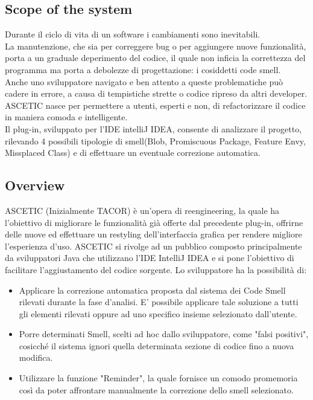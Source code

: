 	   
	   	\subsection{Scope of the system}
	   		Durante il ciclo di vita di un software i cambiamenti sono inevitabili.\\
	   		La manutenzione, che sia per correggere bug o per aggiungere nuove funzionalità, porta a un graduale deperimento del codice, il quale non inficia la correttezza del programma ma porta a debolezze di progettazione: i cosiddetti code smell.\\
	   		Anche uno sviluppatore navigato e ben attento a queste problematiche può cadere in errore, a causa di tempistiche strette o codice ripreso da altri developer.\\
	   	    ASCETIC nasce per permettere a utenti, esperti e non, di refactorizzare il codice in maniera comoda e intelligente.\\
	   		Il plug-in, sviluppato per l'IDE intelliJ IDEA, consente di analizzare il progetto, rilevando 4 possibili tipologie di smell(Blob, Promiscuous Package, Feature Envy, Missplaced Class) e di effettuare un eventuale correzione automatica.
	   		
	   	\subsection{Overview}
	   		ASCETIC (Inizialmente TACOR) è un'opera di reengineering, la quale ha l'obiettivo di migliorare le funzionalità già offerte dal precedente plug-in, offrirne delle nuove ed effettuare un restyling dell'interfaccia grafica per rendere migliore l'esperienza d'uso. ASCETIC si rivolge ad un pubblico composto principalmente da sviluppatori Java che utilizzano l'IDE IntelliJ IDEA e si pone l'obiettivo di facilitare l'aggiustamento del codice sorgente. Lo sviluppatore ha la possibilità di: 
	   		\begin{itemize}
	   			\item Applicare la correzione automatica proposta dal sistema dei Code Smell rilevati durante la fase d'analisi. E' possibile applicare tale soluzione a tutti gli elementi rilevati oppure ad uno specifico insieme selezionato dall'utente.
	   			\item Porre determinati Smell, scelti ad hoc dallo sviluppatore, come "falsi positivi", cosicché il sistema ignori quella determinata sezione di codice fino a nuova modifica. 
	   			\item Utilizzare la funzione "Reminder", la quale fornisce un comodo promemoria così da poter affrontare manualmente la correzione dello smell selezionato. 
	   		
	   		\end{itemize}
	   	

